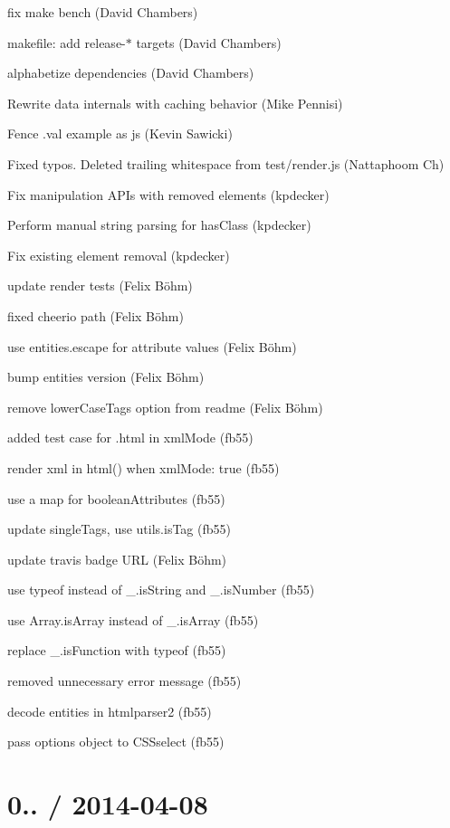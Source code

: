 \begin{DoxyItemize}
\item fix {\ttfamily make bench} (David Chambers)
\item makefile\+: add release-\/$\ast$ targets (David Chambers)
\item alphabetize dependencies (David Chambers)
\item Rewrite {\ttfamily data} internals with caching behavior (Mike Pennisi)
\item Fence .val example as js (Kevin Sawicki)
\item Fixed typos. Deleted trailing whitespace from test/render.\+js (Nattaphoom Ch)
\item Fix manipulation A\+P\+Is with removed elements (kpdecker)
\item Perform manual string parsing for has\+Class (kpdecker)
\item Fix existing element removal (kpdecker)
\item update render tests (Felix Böhm)
\item fixed cheerio path (Felix Böhm)
\item use {\ttfamily entities.\+escape} for attribute values (Felix Böhm)
\item bump entities version (Felix Böhm)
\item remove lower\+Case\+Tags option from readme (Felix Böhm)
\item added test case for .html in xml\+Mode (fb55)
\item render xml in {\ttfamily html()} when {\ttfamily xml\+Mode\+: true} (fb55)
\item use a map for boolean\+Attributes (fb55)
\item update single\+Tags, use utils.\+is\+Tag (fb55)
\item update travis badge U\+RL (Felix Böhm)
\item use typeof instead of \+\_\+.\+is\+String and \+\_\+.\+is\+Number (fb55)
\item use Array.\+is\+Array instead of \+\_\+.\+is\+Array (fb55)
\item replace \+\_\+.\+is\+Function with typeof (fb55)
\item removed unnecessary error message (fb55)
\item decode entities in htmlparser2 (fb55)
\item pass options object to C\+S\+Sselect (fb55)
\end{DoxyItemize}

\section*{0.. / 2014-\/04-\/08 }


